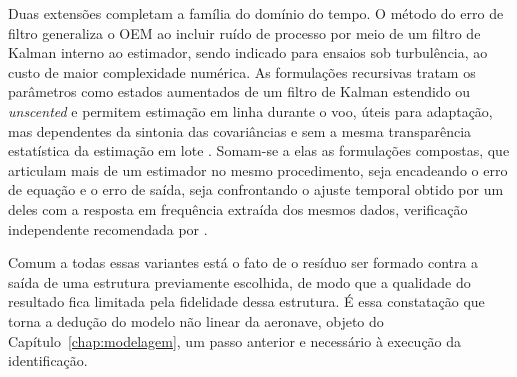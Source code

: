 {Duas extensões completam a família do domínio do tempo. O método do erro de filtro generaliza o OEM ao incluir ruído de processo por meio de um filtro de Kalman interno ao estimador, sendo indicado para ensaios sob turbulência, ao custo de maior complexidade numérica. As formulações recursivas tratam os parâmetros como estados aumentados de um filtro de Kalman estendido ou \textit{unscented} e permitem estimação em linha durante o voo, úteis para adaptação, mas dependentes da sintonia das covariâncias e sem a mesma transparência estatística da estimação em lote \cite{Jategaonkar2015}. Somam-se a elas as formulações compostas, que articulam mais de um estimador no mesmo procedimento, seja encadeando o erro de equação e o erro de saída, seja confrontando o ajuste temporal obtido por um deles com a resposta em frequência extraída dos mesmos dados, verificação independente recomendada por \textcite{Tischler2012}.

Comum a todas essas variantes está o fato de o resíduo ser formado contra a saída de uma estrutura previamente escolhida, de modo que a qualidade do resultado fica limitada pela fidelidade dessa estrutura. É essa constatação que torna a dedução do modelo não linear da aeronave, objeto do Capítulo~\ref{chap:modelagem}, um passo anterior e necessário à execução da identificação.
}
